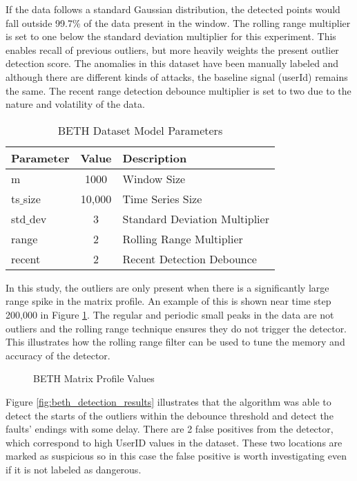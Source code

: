 If the data follows a standard Gaussian distribution, the detected points would fall outside 99.7\% of the data present in the window.
The rolling range multiplier is set to one below the standard deviation multiplier for this experiment.
This enables recall of previous outliers, but more heavily weights the present outlier detection score.
The anomalies in this dataset have been manually labeled and although there are different kinds of attacks, the baseline signal (userId) remains the same.
The recent range detection debounce multiplier is set to two due to the nature and volatility of the data.

\begin{table}[H]
\caption{BETH Dataset Model Parameters}
\begin{tabular}{|l|c|l|}
    \hline
	\textbf{Parameter} & \textbf{Value} & \textbf{Description} \\ \hline
	m & 1000 & Window Size \\ \hline
	ts$\_$size & 10,000 & Time Series Size \\ \hline
	std$\_$dev & 3 & Standard Deviation Multiplier \\ \hline
	range & 2 & Rolling Range Multiplier\\ \hline
	recent & 2 & Recent Detection Debounce\\ \hline
\end{tabular}
\label{tab:beth_sim_params}
\end{table}
 
In this study, the outliers are only present when there is a significantly large range spike in the matrix profile.
An example of this is shown near time step 200,000 in Figure \ref{fig:beth_mp_hist}.
The regular and periodic small peaks  in the data are not outliers and the rolling range technique ensures they do not trigger the detector.
This illustrates how the rolling range filter can be used to tune the memory and accuracy of the detector. 

\begin{figure}[H]
    
    \caption{BETH Matrix Profile Values}
    \label{fig:beth_mp_hist}
\end{figure}

Figure \ref{fig:beth_detection_results} illustrates that the algorithm was able to detect the starts of the outliers within the debounce threshold and detect the faults' endings with some delay.
There are 2 false positives from the detector, which correspond to high UserID values in the dataset.
These two locations are marked as suspicious so in this case the false positive is worth investigating even if it is not labeled as dangerous.

